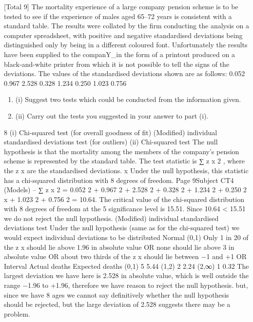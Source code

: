 \documentclass[a4paper,12pt]{article}
\begin{document}
[Total 9]
The mortality experience of a large company pension scheme is to be tested to see if
the experience of males aged 65–72 years is consistent with a standard table. The
results were collated by the firm conducting the analysis on a computer spreadsheet,
with positive and negative standardised deviations being distinguished only by being
in a different coloured font. Unfortunately the results have been supplied to the
companY_in the form of a printout produced on a black-and-white printer from which
it is not possible to tell the signs of the deviations.
The values of the standardised deviations shown are as follows:
0.052
0.967
2.528
0.328
1.234
0.250
1.023
0.756
\begin{enumerate}
\item (i) Suggest two tests which could be conducted from the information given.
\item (ii) Carry out the tests you suggested in your answer to part (i).
\end{enumerate}

8
(i)
Chi-squared test (for overall goodness of fit)
(Modified) individual standardised deviations test (for outliers)
(ii)
Chi-squared test
The null hypothesis is that the mortality among the members of the company’s
pension scheme is represented by the standard table.
The test statistic is
∑ z x 2 , where the z x are the standardised deviations.
x
Under the null hypothesis, this statistic has a chi-squared distribution with 8 degrees
of freedom.
Page 9Subject CT4 (Models) – %
∑ z x 2
= 0.052 2 + 0.967 2 + 2.528 2 + 0.328 2 + 1.234 2 + 0.250 2
x
+ 1.023 2 + 0.756 2 = 10.64.
The critical value of the chi-squared distribution with 8 degrees of freedom at the 5%
significance level is 15.51.
Since 10.64 < 15.51
we do not reject the null hypothesis.
(Modified) individual standardised deviations test
Under the null hypothesis (same as for the chi-squared test)
we would expect individual deviations to be distributed Normal (0,1)
Only 1 in 20 of the z x should lie above 1.96 in absolute value
OR
none should lie above 3 in absolute value
OR
about two thirds of the z x should lie between −1 and +1
OR
Interval
Actual deaths
Expected deaths
(0,1)
5
5.44
(1,2)
2
2.24
(2,∞)
1
0.32
The largest deviation we have here is 2.528 in absolute value,
which is well outside the range −1.96 to +1.96,
therefore we have reason to reject the null hypothesis.
but, since we have 8 ages we cannot say definitively whether the null hypothesis
should be rejected, but the large deviation of 2.528 suggests there may be a problem.


\end{document}
